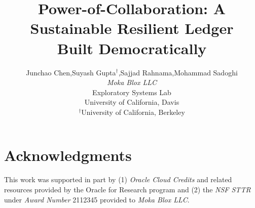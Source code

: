 \documentclass[11pt]{article}
\begin{document}
\title{Power-of-Collaboration: A Sustainable Resilient Ledger \\ Built Democratically}

\author{Junchao Chen,\quad Suyash Gupta$^{\dagger}$,\quad Sajjad Rahnama,\quad Mohammad Sadoghi\\
    \textit{Moka Blox LLC} \\ 
    Exploratory Systems Lab \\ 
    University of California, Davis \\ 
    $^{\dagger}$University of California, Berkeley
}


\maketitle

\begin{abstract}

\end{abstract}






%


\section{Acknowledgments}
This work was supported in part by (1) {\em Oracle Cloud Credits} and 
related resources provided by the Oracle for Research program and (2) the 
{\em NSF STTR} under {\em Award Number} 2112345 provided to {\em Moka Blox LLC}.


%
%
\end{document}
